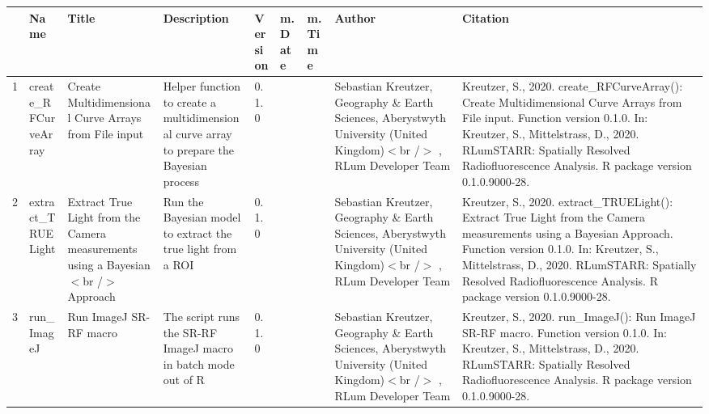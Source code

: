 \begin{table}[ht]
\centering
\begin{tabular}{rllllllll}
  \hline
 & Name & Title & Description & Version & m.Date & m.Time & Author & Citation \\ 
  \hline
1 & create\_RFCurveArray & Create Multidimensional Curve Arrays from File input & Helper function to create a multidimensional curve array to prepare the Bayesian process & 0.1.0
 &  &  & Sebastian Kreutzer, Geography \& Earth Sciences, Aberystwyth University (United Kingdom)$<$br /$>$ , RLum Developer Team & Kreutzer, S., 2020. create\_RFCurveArray(): Create Multidimensional Curve Arrays from File input. Function version 0.1.0. In: Kreutzer, S., Mittelstrass, D., 2020. RLumSTARR: Spatially Resolved Radiofluorescence Analysis. R package version 0.1.0.9000-28. 
 \\ 
  2 & extract\_TRUELight & Extract True Light from the Camera measurements using a Bayesian$<$br /$>$ Approach & Run the Bayesian model to extract the true light from a ROI & 0.1.0
 &  &  & Sebastian Kreutzer, Geography \& Earth Sciences, Aberystwyth University (United Kingdom)$<$br /$>$ , RLum Developer Team & Kreutzer, S., 2020. extract\_TRUELight(): Extract True Light from the Camera measurements using a Bayesian Approach. Function version 0.1.0. In: Kreutzer, S., Mittelstrass, D., 2020. RLumSTARR: Spatially Resolved Radiofluorescence Analysis. R package version 0.1.0.9000-28. 
 \\ 
  3 & run\_ImageJ & Run ImageJ SR-RF macro & The script runs the SR-RF ImageJ macro in batch mode out of R & 0.1.0
 &  &  & Sebastian Kreutzer, Geography \& Earth Sciences, Aberystwyth University (United Kingdom)$<$br /$>$ , RLum Developer Team & Kreutzer, S., 2020. run\_ImageJ(): Run ImageJ SR-RF macro. Function version 0.1.0. In: Kreutzer, S., Mittelstrass, D., 2020. RLumSTARR: Spatially Resolved Radiofluorescence Analysis. R package version 0.1.0.9000-28. 
 \\ 
   \hline
\end{tabular}
\end{table}

